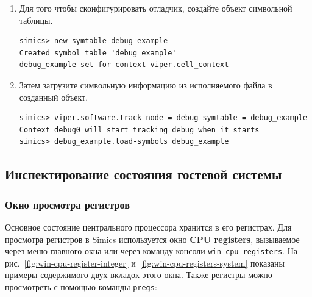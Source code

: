 \begin{enumerate}
\item Для того чтобы сконфигурировать отладчик, создайте объект символьной таблицы.
\begin{lstlisting}
simics> new-symtable debug_example
Created symbol table 'debug_example'
debug_example set for context viper.cell_context
\end{lstlisting}

\item Затем загрузите символьную информацию из исполняемого файла в созданный объект.
\begin{lstlisting}
simics> viper.software.track node = debug symtable = debug_example
Context debug0 will start tracking debug when it starts
simics> debug_example.load-symbols debug_example
\end{lstlisting}

\end{enumerate}

\subsection{Инспектирование состояния гостевой системы}

\subsubsection{Окно просмотра регистров}

Основное состояние центрального процессора хранится в его регистрах. Для просмотра регистров в Simics используется окно \textbf{CPU registers}, вызываемое через меню главного окна или через команду консоли \texttt{win-cpu-registers}. На рис.~\ref{fig:win-cpu-register-integer} и~\ref{fig:win-cpu-registers-system} показаны примеры содержимого двух вкладок этого окна. Также регистры можно просмотреть с помощью команды \texttt{pregs}:

